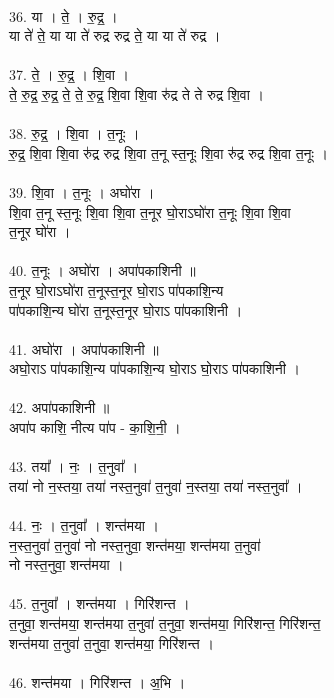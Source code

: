 \\
36. या । ते॒ । रु॒द्र॒ । \\
या ते॑ ते॒ या या ते॑ रुद्र रुद्र ते॒ या या ते॑ रुद्र ।\\
\\
37. ते॒ । रु॒द्र॒ । शि॒वा ।\\
ते॒ रु॒द्र॒ रु॒द्र॒ ते॒ ते॒ रु॒द्र॒ शि॒वा शि॒वा रु॑द्र ते ते रुद्र शि॒वा ।\\
\\
38. रु॒द्र॒ । शि॒वा । त॒नूः ।\\
रु॒द्र॒ शि॒वा शि॒वा रु॑द्र रुद्र शि॒वा त॒नू स्त॒नूः शि॒वा रु॑द्र रुद्र शि॒वा त॒नूः ।\\
\\
39. शि॒वा । त॒नूः । अघो॑रा ।\\
शि॒वा त॒नू स्त॒नूः शि॒वा शि॒वा त॒नूर घो॒राऽघो॑रा त॒नूः शि॒वा शि॒वा\\
त॒नूर घो॑रा ।\\
\\
40. त॒नूः । अघो॑रा । अपा॑पकाशिनी ॥\\
त॒नूर घो॒राऽघो॑रा त॒नूस्त॒नूर घो॒राऽ पा॑पकाशि॒न्य\\
पा॑पकाशि॒न्य घो॑रा त॒नूस्त॒नूर घो॒राऽ पा॑पकाशिनी ।\\
\\
41. अघो॑रा । अपा॑पकाशिनी ॥\\
अघो॒राऽ पा॑पकाशि॒न्य पा॑पकाशि॒न्य घो॒राऽ घो॒राऽ पा॑पकाशिनी ।\\
\\
42. अपा॑पकाशिनी ॥\\
अपा॑प काशि॒ नीत्य पा॑प - का॒शि॒नी॒ ।\\
\\
43. तया᳚ । नः॒ । त॒नुवा᳚ ।\\
तया॑ नो न॒स्तया॒ तया॑ नस्त॒नुवा॑ त॒नुवा॑ न॒स्तया॒ तया॑ नस्त॒नुवा᳚ ।\\
\\
44. नः॒ । त॒नुवा᳚ । शन्त॑मया ।\\
न॒स्त॒नुवा॑ त॒नुवा॑ नो नस्त॒नुवा॒ शन्त॑मया॒ शन्त॑मया त॒नुवा॑\\
नो नस्त॒नुवा॒ शन्त॑मया ।\\
\\
45. त॒नुवा᳚ । शन्त॑मया । गिरि॑शन्त ।\\
त॒नुवा॒ शन्त॑मया॒ शन्त॑मया त॒नुवा॑ त॒नुवा॒ शन्त॑मया॒ गिरि॑शन्त॒ गिरि॑शन्त॒\\
शन्त॑मया त॒नुवा॑ त॒नुवा॒ शन्त॑मया॒ गिरि॑शन्त ।\\
\\
46. शन्त॑मया । गिरि॑शन्त । अ॒भि ।\\
